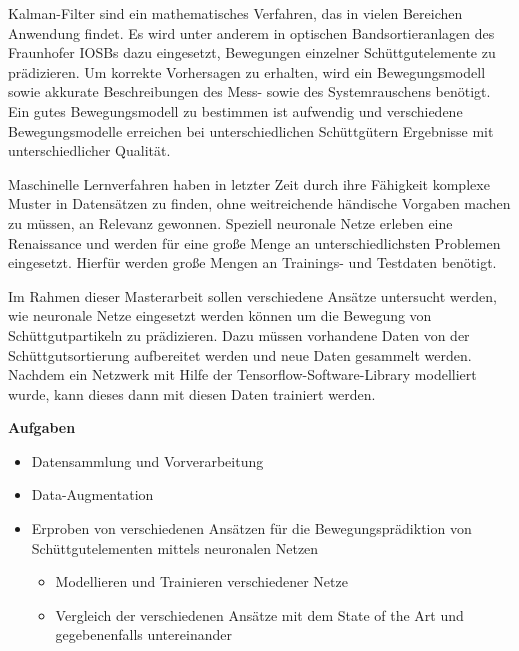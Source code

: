 \documentclass [a4paper, 10pt]{scrartcl}
\begin{document}
\Anfang
Kalman-Filter sind ein mathematisches Verfahren, das in vielen Bereichen Anwendung findet. 
Es wird unter anderem in optischen Bandsortieranlagen des Fraunhofer IOSBs dazu eingesetzt, Bewegungen einzelner Schüttgutelemente zu prädizieren.
Um korrekte Vorhersagen zu erhalten, wird ein Bewegungsmodell sowie akkurate Beschreibungen des Mess- sowie des Systemrauschens benötigt.
Ein gutes Bewegungsmodell zu bestimmen ist aufwendig und verschiedene Bewegungsmodelle erreichen bei unterschiedlichen Schüttgütern Ergebnisse mit unterschiedlicher Qualität.


Maschinelle Lernverfahren haben in letzter Zeit durch ihre Fähigkeit 
komplexe Muster in Datensätzen zu finden, ohne weitreichende händische Vorgaben machen zu müssen, an Relevanz gewonnen.
Speziell neuronale Netze erleben eine Renaissance und werden für eine große Menge an unterschiedlichsten Problemen eingesetzt.
Hierfür werden große Mengen an Trainings- und Testdaten benötigt. 

Im Rahmen dieser Masterarbeit sollen verschiedene Ansätze untersucht werden, wie neuronale Netze eingesetzt werden können um die Bewegung von Schüttgutpartikeln zu prädizieren.
Dazu müssen vorhandene Daten von der Schüttgutsortierung aufbereitet werden und neue Daten gesammelt werden.
Nachdem ein Netzwerk mit Hilfe der Tensorflow-Software-Library modelliert wurde, kann dieses dann mit diesen Daten trainiert werden.





\textbf{Aufgaben}
\begin{itemize}
  \item Datensammlung und Vorverarbeitung
  \item Data-Augmentation
  \item Erproben von verschiedenen Ansätzen für die Bewegungsprädiktion von Schüttgutelementen mittels neuronalen Netzen
  	\begin{itemize}
  		\item Modellieren und Trainieren verschiedener Netze
  		\item Vergleich der verschiedenen Ansätze mit dem State of the Art und gegebenenfalls untereinander
  	\end{itemize}
\end{itemize}
\Ende
\end{document}
